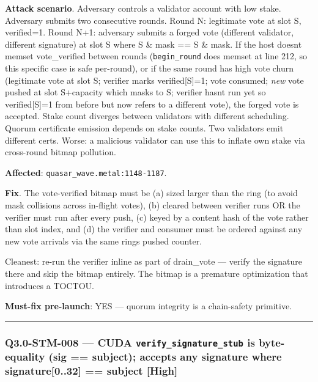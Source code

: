 \documentclass[
]{article}
\begin{document}
\textbf{Attack scenario}. Adversary controls a validator account with
low stake. Adversary submits two consecutive rounds. Round N: legitimate
vote at slot S, verified=1. Round N+1: adversary submits a forged vote
(different validator, different signature) at slot S\textquotesingle{}
where S\textquotesingle{} \& mask == S \& mask. If the host
doesn\textquotesingle t memset vote\_verified between rounds
(\texttt{begin\_round} does memset at line 212, so this specific case is
safe per-round), or if the same round has high vote churn (legitimate
vote at slot S; verifier marks verified{[}S{]}=1; vote consumed;
\emph{new} vote pushed at slot S+capacity which masks to S; verifier
hasn\textquotesingle t run yet so verified{[}S{]}=1 from before but now
refers to a different vote), the forged vote is accepted. Stake count
diverges between validators with different scheduling. Quorum
certificate emission depends on stake counts. Two validators emit
different certs. Worse: a malicious validator can use this to inflate
own stake via cross-round bitmap pollution.

\textbf{Affected}: \texttt{quasar\_wave.metal:1148-1187}.

\textbf{Fix}. The vote-verified bitmap must be (a) sized larger than the
ring (to avoid mask collisions across in-flight votes), (b) cleared
between verifier runs OR the verifier must run after every push, (c)
keyed by a content hash of the vote rather than slot index, and (d) the
verifier and consumer must be ordered against any new vote arrivals via
the same ring\textquotesingle s pushed counter.

Cleanest: re-run the verifier inline as part of drain\_vote --- verify
the signature there and skip the bitmap entirely. The bitmap is a
premature optimization that introduces a TOCTOU.

\textbf{Must-fix pre-launch}: YES --- quorum integrity is a chain-safety
primitive.

\begin{center}\rule{0.5\linewidth}{0.5pt}\end{center}

\subsubsection{\texorpdfstring{Q3.0-STM-008 --- CUDA
\texttt{verify\_signature\_stub} is byte-equality (sig == subject);
accepts any signature where signature{[}0..32{]} == subject
{[}High{]}}{Q3.0-STM-008 --- CUDA verify\_signature\_stub is byte-equality (sig == subject); accepts any signature where signature{[}0..32{]} == subject {[}High{]}}}\label{q30-stm-008--cuda-verify_signature_stub-is-byte-equality-sig--subject-accepts-any-signature-where-signature032--subject-high}
\end{document}
